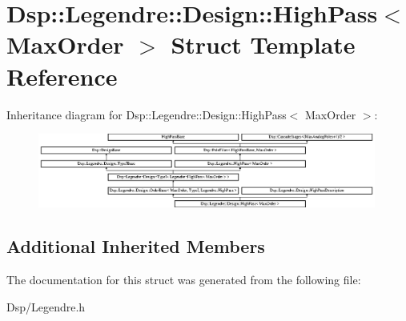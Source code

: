 \hypertarget{structDsp_1_1Legendre_1_1Design_1_1HighPass}{\section{Dsp\-:\-:Legendre\-:\-:Design\-:\-:High\-Pass$<$ Max\-Order $>$ Struct Template Reference}
\label{structDsp_1_1Legendre_1_1Design_1_1HighPass}
}
Inheritance diagram for Dsp\-:\-:Legendre\-:\-:Design\-:\-:High\-Pass$<$ Max\-Order $>$\-:\begin{figure}[H]
\begin{center}
\leavevmode
\includegraphics[height=2.440087cm]{structDsp_1_1Legendre_1_1Design_1_1HighPass}
\end{center}
\end{figure}
\subsection*{Additional Inherited Members}


The documentation for this struct was generated from the following file\-:\begin{DoxyCompactItemize}
\item 
Dsp/Legendre.\-h\end{DoxyCompactItemize}
